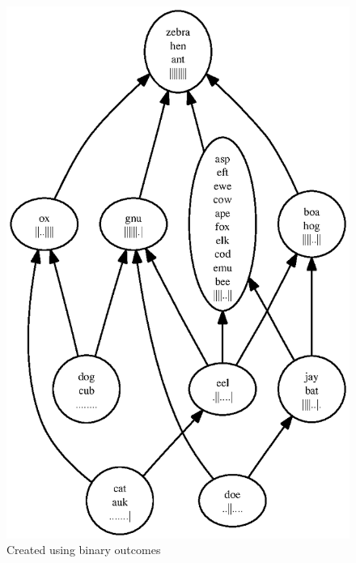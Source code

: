 \documentclass[11pt,twoside]{article}
\begin{document}
\begin{figure}
\centering
\includegraphics[scale=0.75]{rank1.ps}
\caption{Created using binary outcomes}

\end{figure}
\end{document}
